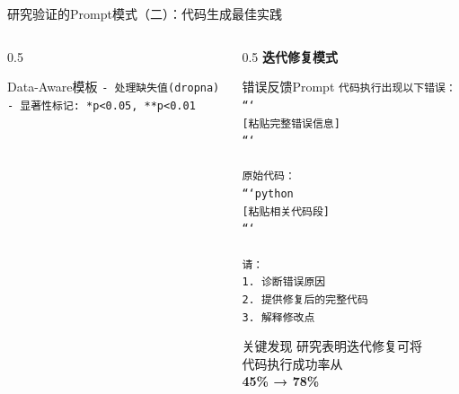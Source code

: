 \documentclass[aspectratio=169,11pt]{beamer}
\begin{document}
\begin{frame}[fragile]{研究验证的Prompt模式（二）：代码生成最佳实践}
\begin{columns}
\begin{column}{0.5\textwidth}
\begin{exampleblock}{Data-Aware模板}
                \texttt{- 处理缺失值(dropna)}\\
                \texttt{- 显著性标记: *p<0.05, **p<0.01}
            \end{exampleblock}
        \end{column}
        \begin{column}{0.5\textwidth}
            \textbf{迭代修复模式}
            \begin{alertblock}{错误反馈Prompt}
                \scriptsize
                \texttt{代码执行出现以下错误：}\\
                \texttt{```}\\
                \texttt{[粘贴完整错误信息]}\\
                \texttt{```}\\
                \texttt{}\\
                \texttt{原始代码：}\\
                \texttt{```python}\\
                \texttt{[粘贴相关代码段]}\\
                \texttt{```}\\
                \texttt{}\\
                \texttt{请：}\\
                \texttt{1. 诊断错误原因}\\
                \texttt{2. 提供修复后的完整代码}\\
                \texttt{3. 解释修改点}
            \end{alertblock}
            
            \vspace{0.2cm}
            \begin{block}{关键发现}
                \small
                研究表明迭代修复可将\\
                代码执行成功率从\\
                \textbf{45\% → 78\%}
            \end{block}
        \end{column}
    \end{columns}
\end{frame}
\end{document}

